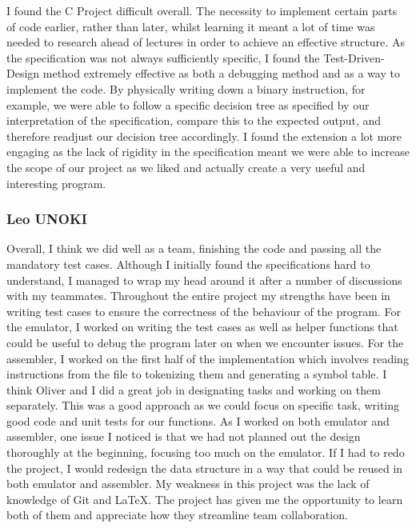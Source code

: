 \documentclass[11pt]{article}
\begin{document}
I found the C Project difficult overall. The necessity to implement certain parts of code earlier, rather than later, whilst learning it meant a lot of time was needed to research ahead of lectures in order to achieve an effective structure. As the specification was not always sufficiently specific, I found the Test-Driven-Design method extremely effective as both a debugging method and as a way to implement the code.  By physically writing down a binary instruction, for example, we were able to follow a specific decision tree as specified by our interpretation of the specification, compare this to the expected output, and therefore readjust our decision tree accordingly. I found the extension a lot more engaging as the lack of rigidity in the specification meant we were able to increase the scope of our project as we liked and actually create a very useful and interesting program.

\subsubsection{Leo UNOKI}
Overall, I think we did well as a team, finishing the code and passing all the mandatory test cases. Although I initially found the specifications hard to understand, I managed to wrap my head around it after a number of discussions with my teammates. Throughout the entire project my strengths have been in writing test cases to ensure the correctness of the behaviour of the program. For the emulator, I worked on writing the test cases as well as helper functions that could be useful to debug the program later on when we encounter issues. For the assembler, I worked on the first half of the implementation which involves reading instructions from the file to tokenizing them and generating a symbol table. I think Oliver and I did a great job in designating tasks and working on them separately. This was a good approach as we could focus on specific task, writing good code and unit tests for our functions. As I worked on both emulator and assembler, one issue I noticed is that we had not planned out the design thoroughly at the beginning, focusing too much on the emulator. If I had to redo the project, I would redesign the data structure in a way that could be reused in both emulator and assembler. My weakness in this project was the lack of knowledge of Git and \LaTeX{}. The project has given me the opportunity to learn both of them and appreciate how they streamline team collaboration.  
\end{document}
